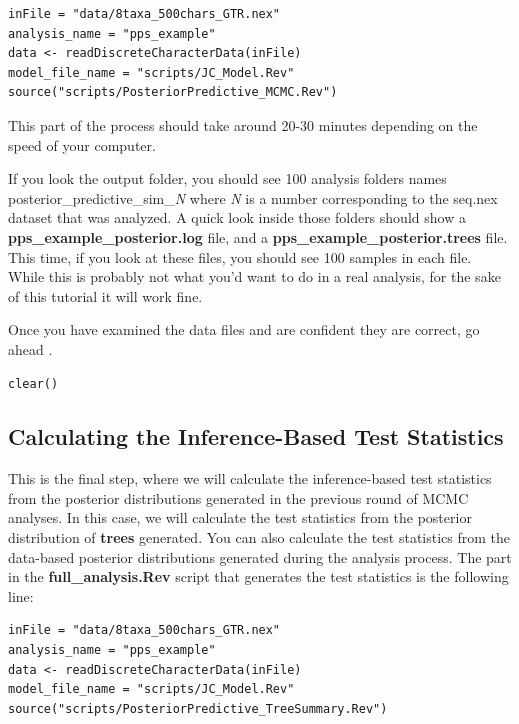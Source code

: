 {\tt \begin{Snugshade}[184,207,236]
\begin{lstlisting}
inFile = "data/8taxa_500chars_GTR.nex"
analysis_name = "pps_example"
data <- readDiscreteCharacterData(inFile)
model_file_name = "scripts/JC_Model.Rev"
source("scripts/PosteriorPredictive_MCMC.Rev")
\end{lstlisting}
\end{Snugshade}}

This part of the process should take around 20-30 minutes depending on the speed of your computer. 

If you look the output folder, you should see 100 analysis folders names posterior\_predictive\_sim\_\textit{N} 
where \textit{N} is a number corresponding to the seq.nex dataset that was analyzed. A quick look inside those 
folders should show a \textbf{pps\_example\_posterior.log} file, and a \textbf{pps\_example\_posterior.trees} 
file. This time, if you look at these files, you should see 100 samples in each file. While this is 
probably not what you'd want to do in a real analysis, for the sake of this tutorial it will work fine. 

Once you have examined the data files and are confident they are correct, go ahead  \RevBayes.

{\tt \begin{Snugshade}[184,207,236]
\begin{lstlisting}
clear()
\end{lstlisting}
\end{Snugshade}}

\subsection{Calculating the Inference-Based Test Statistics}
This is the final step, where we will calculate the inference-based test statistics from the posterior 
distributions generated in the previous round of MCMC analyses. In this case, we will calculate the 
test statistics from the posterior distribution of \textbf{trees} generated. You can also calculate 
the test statistics from the data-based posterior distributions generated during the analysis process. 
The part in the \textbf{full\_analysis.Rev} script that generates the test statistics is the following line:

{\tt \begin{snugshade*}
\begin{lstlisting}
inFile = "data/8taxa_500chars_GTR.nex"
analysis_name = "pps_example"
data <- readDiscreteCharacterData(inFile)
model_file_name = "scripts/JC_Model.Rev"
source("scripts/PosteriorPredictive_TreeSummary.Rev")
\end{lstlisting}
\end{snugshade*}}

